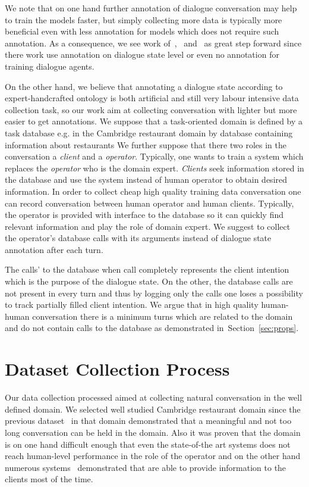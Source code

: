 \documentclass[runningheads,a4paper]{llncs}
\begin{document}
We note that on one hand further annotation of dialogue conversation may help to train the models faster, but simply collecting more data is typically more beneficial even with less annotation for models which does not require such annotation.
As a consequence, we see work of~\cite{Wen},~\cite{Borders} and~\cite{Williams} as great step forward since there work use annotation on dialogue state level or even no annotation for training dialogue agents.

On the other hand, we believe that annotating a dialogue state according to expert-handcrafted ontology is both artificial and still very labour intensive data collection task, so our work aim at collecting conversation with lighter but more easier to get annotations.
We suppose that a task-oriented  domain is defined by a task database e.g. in the Cambridge restaurant domain by database containing information about restaurants
We further suppose that there two roles in the conversation a {\it client} and a {\it operator}.
Typically, one wants to train a system which replaces the {\it operator} who is the domain expert.
{\it Clients} seek information stored in the database and use the system instead of human operator to obtain desired information.
In order to collect cheap high quality training data conversation one can record conversation between human operator and human clients.
Typically, the operator is provided with interface to the database so it can quickly find relevant information and play the role of domain expert.
We suggest to collect the operator's database calls with its arguments instead of dialogue state annotation after each turn.

The calls' to the database when call completely represents the client intention which is the purpose of the dialogue state.
On the other, the database calls are not present in every turn and thus by logging only the calls one loses a possibility to track partially filled client intention.
We argue that in high quality human-human conversation there is a minimum turns which are related to the domain and do not contain calls to the database as demonstrated in~Section~\ref{sec:props}.

\section{Dataset Collection Process}
\label{sec:collection}

Our data collection processed aimed at collecting natural conversation in the well defined domain.
We selected well studied Cambridge restaurant domain since the previous dataset~\cite{dstc1, dstc2, dstc3} in that domain demonstrated that a meaningful and not too long conversation can be held in the domain.
Also it was proven that the domain is on one hand difficult enough that even the state-of-the art systems does not reach human-level performance in the role of the operator and on the other hand numerous systems~\cite{young, gasic, Wen} demonstrated that are able to provide information to the clients most of the time.
\end{document}
